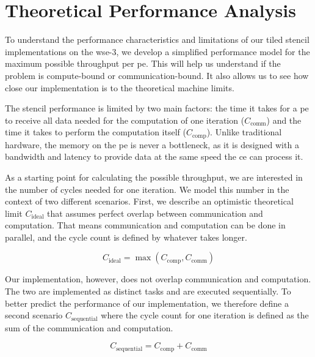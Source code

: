 \chapter{Theoretical Performance Analysis}
\label{sec:theory_performance}
To understand the performance characteristics and limitations of our tiled stencil implementations on the \ac{wse}-3, we develop a simplified performance model for the maximum possible throughput per \ac{pe}. This will help us understand if the problem is compute-bound or communication-bound. It also allows us to see how close our implementation is to the theoretical machine limits.

The stencil performance is limited by two main factors: the time it takes for a \ac{pe} to receive all data needed for the computation of one iteration ($C_{\mathrm{comm}}$) and the time it takes to perform the computation itself ($C_{\mathrm{comp}}$). Unlike traditional hardware, the memory on the \ac{pe} is never a bottleneck, as it is designed with a bandwidth and latency to provide data at the same speed the \ac{ce} can process it.

As a starting point for calculating the possible throughput, we are interested in the number of cycles needed for one iteration. We model this number in the context of two different scenarios. First, we describe an optimistic theoretical limit $C_{\mathrm{ideal}}$ that assumes perfect overlap between communication and computation. That means communication and computation can be done in parallel, and the cycle count is defined by whatever takes longer.

\begin{equation}
    \label{eq:c_ideal}
    C_{\mathrm{ideal}} = \max\left(C_{\mathrm{comp}}, C_{\mathrm{comm}}\right)
\end{equation}


Our implementation, however, does not overlap communication and computation. The two are implemented as distinct tasks and are executed sequentially. To better predict the performance of our implementation, we therefore define a second scenario $C_{\mathrm{sequential}}$ where the cycle count for one iteration is defined as the sum of the communication and computation.

\begin{equation}
    \label{eq:c_sequential}
    C_{\mathrm{sequential}} = C_{\mathrm{comp}} + C_{\mathrm{comm}}
\end{equation}

